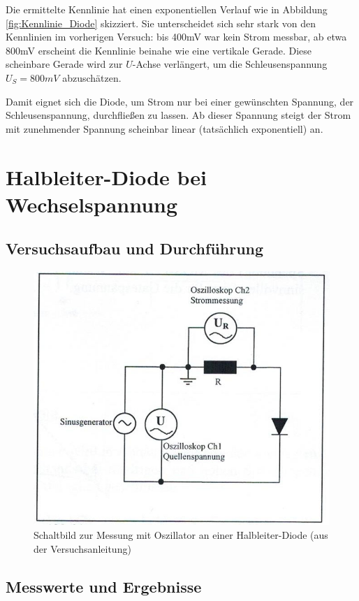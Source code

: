 \documentclass{scrartcl}
\begin{document}
Die ermittelte Kennlinie hat einen exponentiellen Verlauf wie in Abbildung \ref{fig:Kennlinie_Diode} skizziert. Sie unterscheidet sich sehr stark von den Kennlinien im vorherigen Versuch: bis 400mV war kein Strom messbar, ab etwa 800mV erscheint die Kennlinie beinahe wie eine vertikale Gerade. Diese scheinbare Gerade wird zur $U$-Achse verlängert, um die Schleusenspannung $U_{S} = 800mV$ abzuschätzen.

Damit eignet sich die Diode, um Strom nur bei einer gewünschten Spannung, der Schleusenspannung, durchfließen zu lassen. Ab dieser Spannung steigt der Strom mit zunehmender Spannung scheinbar linear (tatsächlich exponentiell) an. 


\pagebreak
\section{Halbleiter-Diode bei Wechselspannung}
\subsection{Versuchsaufbau und Durchführung}

\begin{figure}[H]
  \centering
    \includegraphics[scale=0.75]{Aufbau3.JPG}
  \caption{Schaltbild zur Messung mit Oszillator an einer Halbleiter-Diode (aus der Versuchsanleitung)}
  \label{fig:Aufbau3}
\end{figure}

\subsection{Messwerte und Ergebnisse}
\end{document}
